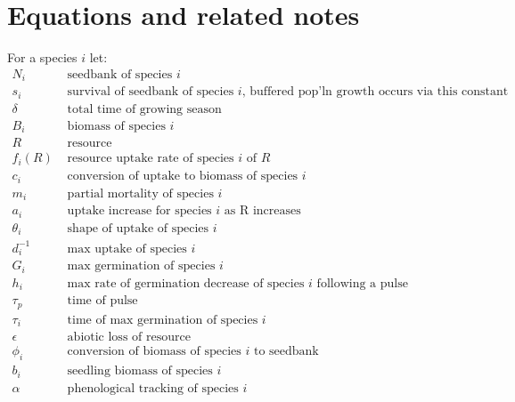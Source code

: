\documentclass[11pt,a4paper,oneside]{article}
\begin{document}
\newpage
\section{Equations and related notes}

\noindent For a species \(i\) let:
\begin{align*}
N_{i} & \text{   seedbank of species } i
\\
s_{i} & \text{   survival of seedbank of species } i \text{, buffered pop'ln
  growth occurs via this constant}
\\
\delta & \text{   total time of growing season}
\\
B_{i} &  \text{   biomass of species } i
\\
R &   \text{   resource}
\\
f_{i}(R) & \text{  resource uptake rate of species } i \text{ of } R
\\
c_{i} & \text{   conversion of uptake to biomass of species } i
\\
m_{i} & \text{   partial mortality of species } i
\\
a_{i} & \text{   uptake increase for species } i \text{ as R increases}
\\
\theta_{i} & \text{   shape of uptake of species } i
\\
d_{i}^{-1} & \text{   max uptake of species } i
\\
G_{i} & \text{   max germination of species } i
\\
h_{i} & \text{   max rate of germination decrease of species } i
\text{ following a pulse}
\\
\tau_{p} & \text{   time of pulse }
\\
\tau_{i} & \text{   time of max germination of species } i
\\
\epsilon & \text{   abiotic loss of resource}
\\
\phi_{i} & \text{   conversion of biomass of species } i \text{ to
  seedbank}
\\
b_{i} & \text{   seedling biomass of species } i
\\
\alpha & \text{   phenological tracking of species  } i
\\
\end{align*}
\end{document}
